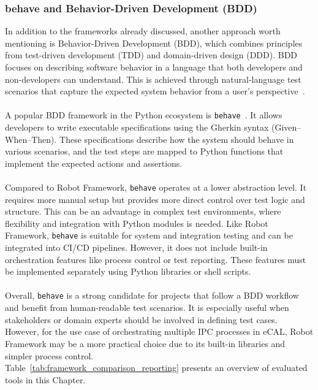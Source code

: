 \newpage
\subsubsection*{behave and Behavior-Driven Development (BDD)}

In addition to the frameworks already discussed, another approach worth mentioning is Behavior-Driven Development (BDD), which combines principles from test-driven development (TDD) and domain-driven design (DDD). BDD focuses on describing software behavior in a language that both developers and non-developers can understand. This is achieved through natural-language test scenarios that capture the expected system behavior from a user's perspective~\cite{North2006}.
\\
\\
A popular BDD framework in the Python ecosystem is \texttt{behave}~\cite{BehaveDocs}. It allows developers to write executable specifications using the Gherkin syntax (Given–When–Then). These specifications describe how the system should behave in various scenarios, and the test steps are mapped to Python functions that implement the expected actions and assertions.
\\
\\
Compared to Robot Framework, \texttt{behave} operates at a lower abstraction level. It requires more manual setup but provides more direct control over test logic and structure. This can be an advantage in complex test environments, where flexibility and integration with Python modules is needed. Like Robot Framework, \texttt{behave} is suitable for system and integration testing and can be integrated into CI/CD pipelines. However, it does not include built-in orchestration features like process control or test reporting. These features must be implemented separately using Python libraries or shell scripts.
\\
\\
Overall, \texttt{behave} is a strong candidate for projects that follow a BDD workflow and benefit from human-readable test scenarios. It is especially useful when stakeholders or domain experts should be involved in defining test cases. However, for the use case of orchestrating multiple IPC processes in eCAL, Robot Framework may be a more practical choice due to its built-in libraries and simpler process control.
\\

Table~\ref{tab:framework_comparison_reporting} presents an overview of evaluated tools in this Chapter.

